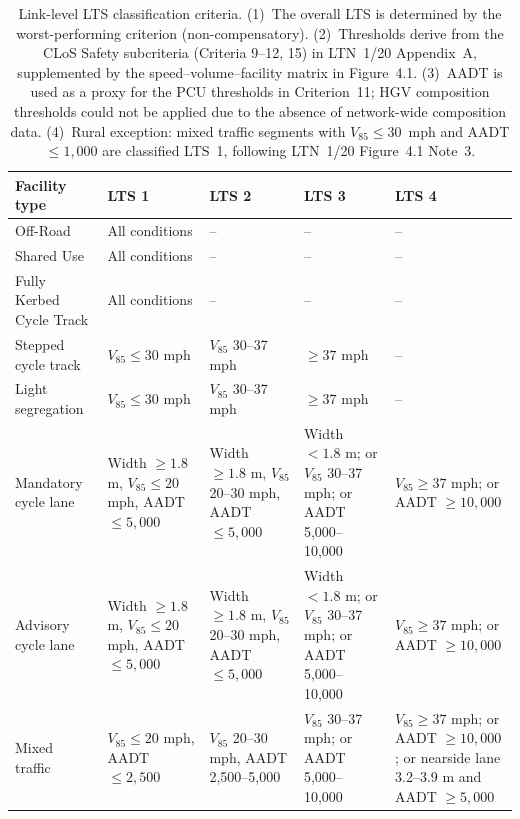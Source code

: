 \documentclass[final,5p,times,twocolumn,authoryear]{elsarticle}
\begin{document}
\begin{table}[!t]
\centering
\caption{Link-level LTS classification criteria. (1)~The overall LTS is determined by the worst-performing criterion (non-compensatory). (2)~Thresholds derive from the CLoS Safety subcriteria (Criteria 9--12, 15) in LTN~1/20 Appendix~A, supplemented by the speed--volume--facility matrix in Figure~4.1. (3)~AADT is used as a proxy for the PCU thresholds in Criterion~11; HGV composition thresholds could not be applied due to the absence of network-wide composition data. (4)~Rural exception: mixed traffic segments with $V_{85} \leq 30$~mph and AADT $\leq 1{,}000$ are classified LTS~1, following LTN~1/20 Figure~4.1 Note~3.}
\label{tab:link-lts}
\footnotesize
\begin{tabularx}{\textwidth}{Z{0.85} Z{1.0} Z{1.0} Z{1.05} Z{1.1}}
\toprule
Facility type & LTS 1 & LTS 2 & LTS 3 & LTS 4 \\
\midrule
Off-Road & All conditions & -- & -- & -- \\
Shared Use & All conditions & -- & -- & -- \\
Fully Kerbed Cycle Track & All conditions & -- & -- & -- \\
Stepped cycle track & $V_{85} \leq 30$ mph & $V_{85}$ 30--37 mph & $\geq 37$ mph & -- \\
Light segregation & $V_{85} \leq 30$ mph & $V_{85}$ 30--37 mph & $\geq 37$ mph & -- \\
Mandatory cycle lane & Width $\geq 1.8$ m, $V_{85} \leq 20$ mph, AADT $\leq 5{,}000$ & Width $\geq 1.8$ m, $V_{85}$ 20--30 mph, AADT $\leq 5{,}000$ & Width $< 1.8$ m; or $V_{85}$ 30--37 mph; or AADT 5,000--10,000 & $V_{85} \geq 37$ mph; or AADT $\geq 10{,}000$ \\
Advisory cycle lane & Width $\geq 1.8$ m, $V_{85} \leq 20$ mph, AADT $\leq 5{,}000$ & Width $\geq 1.8$ m, $V_{85}$ 20--30 mph, AADT $\leq 5{,}000$ & Width $< 1.8$ m; or $V_{85}$ 30--37 mph; or AADT 5,000--10,000 & $V_{85} \geq 37$ mph; or AADT $\geq 10{,}000$ \\
Mixed traffic & $V_{85} \leq 20$ mph, AADT $\leq 2{,}500$ & $V_{85}$ 20--30 mph, AADT 2,500--5,000 & $V_{85}$ 30--37 mph; or AADT 5,000--10,000 & $V_{85} \geq 37$ mph; or AADT $\geq 10{,}000$; or nearside lane 3.2--3.9 m and AADT $\geq 5{,}000$ \\
\bottomrule
\end{tabularx}
\end{table}
\end{document}
